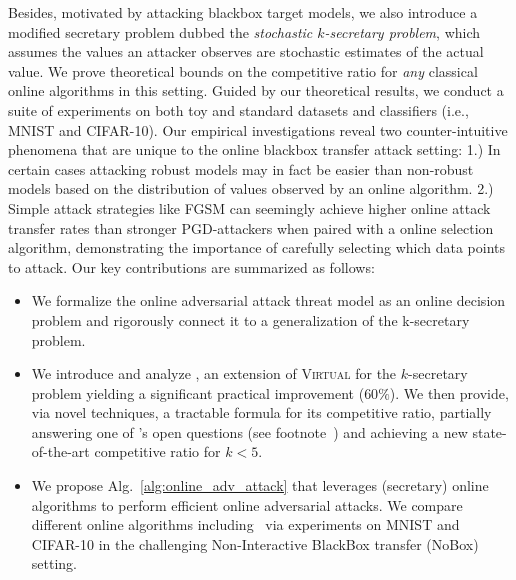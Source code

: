 Besides, motivated by attacking blackbox target models, we also introduce a modified secretary problem dubbed the \textit{stochastic $k$-secretary problem}, which assumes the values an attacker observes are stochastic estimates of the actual value. We prove theoretical bounds on the competitive ratio for \emph{any} classical online algorithms in this setting. Guided by our theoretical results, we conduct a suite of experiments on both toy and standard datasets and classifiers (i.e., MNIST and CIFAR-10). Our empirical investigations reveal two counter-intuitive phenomena that are unique to the online blackbox transfer attack setting: 1.) In certain cases attacking robust models may in fact be easier than non-robust models based on the distribution of values observed by an online algorithm. 2.) Simple attack strategies like FGSM can seemingly achieve higher online attack transfer rates than stronger PGD-attackers when paired with a online selection algorithm, demonstrating the importance of carefully selecting which data points to attack. Our key contributions are summarized as follows:



\begin{itemize}[noitemsep,topsep=0pt,parsep=0pt,partopsep=0pt,label={\large\textbullet},leftmargin=*]
\item We formalize the online adversarial attack threat model as an online decision problem and rigorously connect it to a generalization of the k-secretary problem.
\item We introduce and analyze \algoname, an extension of \textsc{Virtual} for the $k$-secretary problem yielding a significant practical improvement ($60\%$). %
We then provide, via novel techniques, a tractable formula for its competitive ratio, partially answering one of \citet{albers2020new}'s open questions (see footnote~) and achieving a new state-of-the-art competitive ratio for $k<5$.
\item We propose Alg.~\ref{alg:online_adv_attack} that leverages (secretary) online algorithms to perform efficient online adversarial attacks. We compare different online algorithms including \algoname\ via experiments on MNIST and CIFAR-10 in the challenging Non-Interactive BlackBox transfer (NoBox) setting.%
\end{itemize}

